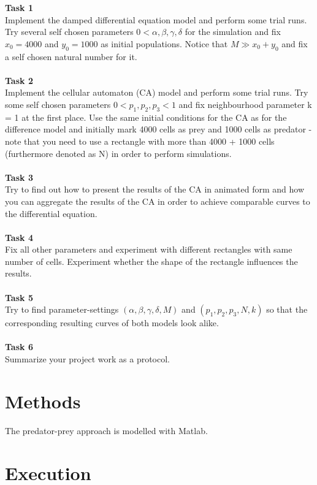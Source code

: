 \documentclass[a4paper,12pt]{article}
\begin{document}
\textbf {Task 1}\\ 
Implement the damped differential equation model and perform some trial runs. Try several self chosen
parameters $0 < \alpha,\beta,\gamma,\delta$ for the simulation and fix $x_0 = 4000$ and $y_0 = 1000$ as initial populations.
Notice that $M  \gg x_0 + y_0$ and fix a self chosen natural number for it. \\ \ \\
\textbf {Task 2}\\ 
Implement the cellular automaton (CA) model and perform some trial runs. Try some self chosen
parameters $0 < p_1, p_2, p_3 < 1$ and fix neighbourhood parameter k = 1 at the first place. Use the same
initial conditions for the CA as for the difference model and initially mark 4000 cells as prey and 1000
cells as predator - note that you need to use a rectangle with more than 4000 + 1000 cells (furthermore
denoted as N) in order to perform simulations.\\ \ \\
\textbf {Task 3}\\ 
Try to find out how to present the results of the CA in animated form and how you can aggregate the
results of the CA in order to achieve comparable curves to the differential equation.\\ \ \\
\textbf {Task 4}\\ 
Fix all other parameters and experiment with different rectangles with same number of cells. Experiment
whether the shape of the rectangle influences the results.\\ \ \\
\textbf {Task 5}\\ 
Try to find parameter-settings $(\alpha,\beta,\gamma,\delta, M)$ and $(p_1, p_2, p_3,N, k)$ so that the corresponding resulting
curves of both models look alike.\\ \ \\
\textbf {Task 6}\\ 
Summarize your project work as a protocol.\\ 


\section{Methods}
The predator-prey approach is modelled with Matlab.

\section{Execution}
\end{document}
